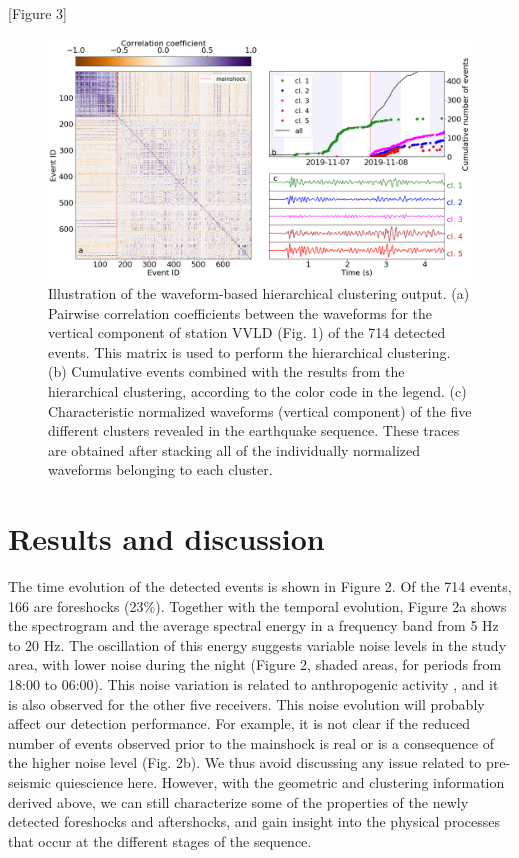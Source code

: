 \documentclass[a4paper,12pt,twoside]{article}
\begin{document}
\begin{center}
   [Figure 3]
\end{center}

\begin{figure}
    \centering
     \includegraphics[width=1\linewidth]{wigg_cc_mat_cluster.png}    \caption{Illustration of the waveform-based hierarchical clustering output. (a) Pairwise correlation coefficients between the waveforms for the vertical component of station VVLD (Fig. 1) of the 714 detected events. This matrix is used to perform the hierarchical clustering. (b) Cumulative events combined with the results from the hierarchical clustering, according to the color code in the legend. (c) Characteristic normalized waveforms (vertical component) of the five different clusters revealed in the earthquake sequence. These traces are obtained after stacking all of the individually normalized waveforms belonging to each cluster.}
\end{figure}    \label{fig:declustering}


\section*{Results and discussion}
\label{sec:results}

The time evolution of the detected events is shown in Figure 2. Of the 714 events, 166 are foreshocks (23\%). Together with the temporal evolution, Figure 2a shows the spectrogram and the average spectral energy in a frequency band from 5 Hz to 20 Hz. The oscillation of this energy suggests variable noise levels in the study area, with lower noise during the night (Figure 2, shaded areas, for periods from 18:00 to 06:00). This noise variation is related to anthropogenic activity \citep{Poli_2020}, and it is also observed for the other five receivers. This noise evolution will probably affect our detection performance. For example, it is not clear if the reduced number of events observed prior to the mainshock is real or is a consequence of the higher noise level (Fig. 2b). We thus avoid discussing any issue related to pre-seismic quiescience here. However, with the geometric and clustering information derived above, we can still characterize some of the properties of the newly detected foreshocks and aftershocks, and gain insight into the physical processes that occur at the different stages of the sequence.
\end{document}
